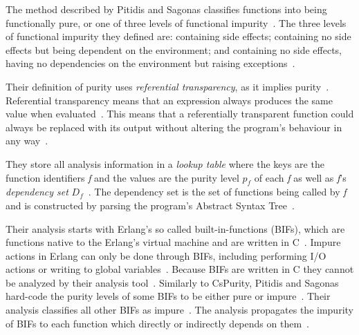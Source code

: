 \documentclass[a4paper,12pt]{article}
\begin{document}
The method described by Pitidis and Sagonas classifies functions into being functionally pure, or one of three levels of functional impurity~\cite{pitidis2010purity}. The three levels of functional impurity they defined are: containing side effects; containing no side effects but being dependent on the environment; and containing no side effects, having no dependencies on the environment but raising exceptions~\cite{pitidis2010purity}.

Their definition of purity uses \textit{referential transparency}, as it implies purity~\cite{pitidis2010purity}. Referential transparency means that an expression always produces the same value when evaluated~\cite{pitidis2010purity}. This means that a referentially transparent function could always be replaced with its output without altering the program's behaviour in any way~\cite{pitidis2010purity}.

They store all analysis information in a \textit{lookup table} where the keys are the function identifiers \textit{f} and the values are the purity level \textit{$p_f$} of each \textit{f} as well as \textit{f}'s \textit{dependency set} $D_f$~\cite{pitidis2010purity}. The dependency set is the set of functions being called by \textit{f} and is constructed by parsing the program's Abstract Syntax Tree~\cite{pitidis2010purity}.

Their analysis starts with Erlang's so called built-in-functions (BIFs), which are functions native to the Erlang's virtual machine and are written in C~\cite{pitidis2010purity}. Impure actions in Erlang can only be done through BIFs, including performing I/O actions or writing to global variables~\cite{kostis-email}. Because BIFs are written in C they cannot be analyzed by their analysis tool~\cite{pitidis2010purity}. Similarly to CsPurity, Pitidis and Sagonas hard-code the purity levels of some BIFs to be either pure or impure~\cite{pitidis2010purity}. Their analysis classifies all other BIFs as impure~\cite{pitidis2010purity}. The analysis propagates the impurity of BIFs to each function which directly or indirectly depends on them~\cite{pitidis2010purity}.
\end{document}
